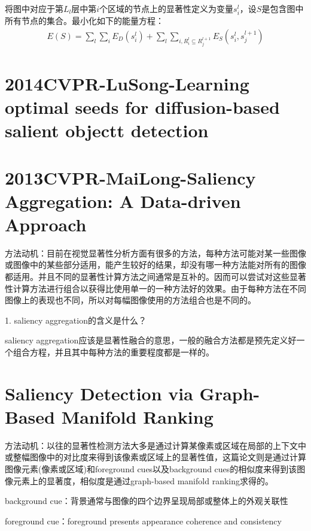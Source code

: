 \documentclass[12pt]{article}
\begin{document}
将图中对应于第$L_l$层中第$i$个区域的节点上的显著性定义为变量$s_i^l$，设$S$是包含图中所有节点的集合。最小化如下的能量方程：
\begin{align}
E(S) = \sum_l \sum_i E_D(s_i^l)+\sum_l \sum_{i, R_i^l \subseteq R_j ^{l+1}} E_S(s_i^l, s_j^{l+1})
\end{align}

\section{2014CVPR-LuSong-Learning optimal seeds for diffusion-based salient objectt detection}

\section{2013CVPR-MaiLong-Saliency Aggregation: A Data-driven Approach}

方法动机：目前在视觉显著性分析方面有很多的方法，每种方法可能对某一些图像或图像中的某些部分适用，能产生较好的结果，却没有哪一种方法能对所有的图像都适用。并且不同的显著性计算方法之间通常是互补的。因而可以尝试对这些显著性计算方法进行组合以获得比使用单一的一种方法好的效果。由于每种方法在不同图像上的表现也不同，所以对每幅图像使用的方法组合也是不同的。

1. saliency aggregation的含义是什么？

saliency aggregation应该是显著性融合的意思，一般的融合方法都是预先定义好一个组合方程，并且其中每种方法的重要程度都是一样的。

\section{Saliency Detection via Graph-Based Manifold Ranking}

方法动机：以往的显著性检测方法大多是通过计算某像素或区域在局部的上下文中或整幅图像中的对比度来得到该像素或区域上的显著性值，这篇论文则是通过计算图像元素(像素或区域)和foreground cues以及background cues的相似度来得到该图像元素上的显著度，相似度是通过graph-based manifold ranking求得的。

background cue：背景通常与图像的四个边界呈现局部或整体上的外观关联性

foreground cue：foreground presents appearance coherence and consistency
\end{document}
